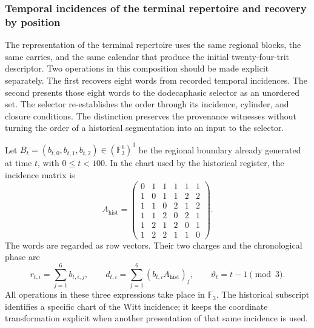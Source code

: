 \subsubsection{Temporal incidences of the terminal repertoire and recovery by position}
\label{act21:sec:repertorio-incidencias-completas}

The representation of the terminal repertoire uses the same regional blocks,
the same carries, and the same calendar that produce the initial
twenty-four-trit descriptor. Two operations in this
composition should be made explicit separately. The first recovers eight words from
recorded temporal incidences. The second presents those eight words to the dodecaphasic
selector as an unordered set. The selector re-establishes
the order through its incidence, cylinder, and closure conditions.
The distinction preserves the provenance witnesses without turning
the order of a historical segmentation into an input to the selector.

Let $B_t=(b_{t,0},b_{t,1},b_{t,2})\in(\mathbb F_3^6)^3$ be the regional boundary
already generated at time $t$, with $0\leq t<100$. In the chart
used by the historical register, the incidence matrix is
\[
 A_{\mathrm{hist}}=
 \begin{pmatrix}
 0&1&1&1&1&1\\
 1&0&1&1&2&2\\
 1&1&0&2&1&2\\
 1&1&2&0&2&1\\
 1&2&1&2&0&1\\
 1&2&2&1&1&0
 \end{pmatrix}.
\]
The words are regarded as row vectors. Their two charges and the
chronological phase are
\[
 r_{t,i}=\sum_{j=1}^{6}b_{t,i,j},\qquad
 d_{t,i}=\sum_{j=1}^{6}(b_{t,i}A_{\mathrm{hist}})_j,
 \qquad \vartheta_t=t-1\pmod 3.
\]
All operations in these three expressions take place in
$\mathbb F_3$. The historical subscript identifies a specific chart of
the Witt incidence; it keeps the coordinate transformation explicit
when another presentation of that same incidence is used.

